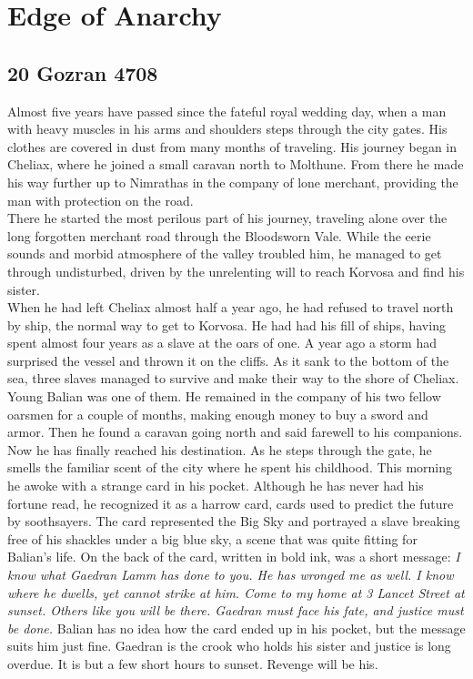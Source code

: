 \chapter{Edge of Anarchy}

\section{20 Gozran 4708}

Almost five years have passed since the fateful royal wedding day, when a man with heavy muscles in his arms and shoulders steps through the city gates. His clothes are covered in dust from many months of traveling. His journey began in Cheliax, where he joined a small caravan north to Molthune. From there he made his way further up to Nimrathas in the company of lone merchant, providing the man with protection on the road.\\

There he started the most perilous part of his journey, traveling alone over the long forgotten merchant road through the Bloodsworn Vale. While the eerie sounds and morbid atmosphere of the valley troubled him, he managed to get through undisturbed, driven by the unrelenting will to reach Korvosa and find his sister.\\

When he had left Cheliax almost half a year ago, he had refused to travel north by ship, the normal way to get to Korvosa. He had had his fill of ships, having spent almost four years as a slave at the oars of one. A year ago a storm had surprised the vessel and thrown it on the cliffs. As it sank to the bottom of the sea, three slaves managed to survive and make their way to the shore of Cheliax. Young Balian was one of them. He remained in the company of his two fellow oarsmen for a couple of months, making enough money to buy a sword and armor. Then he found a caravan going north and said farewell to his companions.\\

Now he has finally reached his destination. As he steps through the gate, he smells the familiar scent of the city where he spent his childhood. This morning he awoke with a strange card in his pocket. Although he has never had his fortune read, he recognized it as a harrow card, cards used to predict the future by soothsayers. The card represented the Big Sky and portrayed a slave breaking free of his shackles under a big blue sky, a scene that was quite fitting for Balian's life. On the back of the card, written in bold ink, was a short message:  {\itshape I know what Gaedran Lamm has done to you. He has wronged me as well. I know where he dwells, yet cannot strike at him. Come to my home at 3 Lancet Street at sunset. Others like you will be there. Gaedran must face his fate, and justice must be done.}  Balian has no idea how the card ended up in his pocket, but the message suits him just fine. Gaedran is the crook who holds his sister and justice is long overdue. It is but a few short hours to sunset. Revenge will be his.\\

